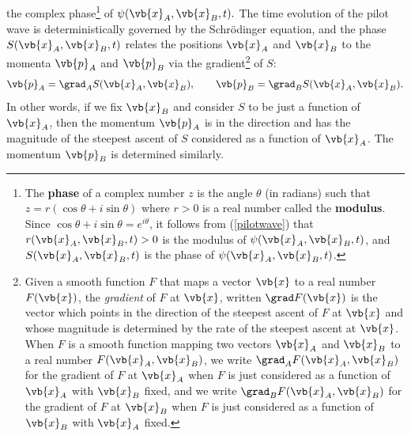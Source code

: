 \documentclass[12pt]{report}
\begin{document}
%
the complex phase\footnote{The \textbf{phase} of a complex number $z$ is the angle $\theta$ (in radians) such that $z=r(\cos \theta + i \sin \theta)$ where $r>0$ is a real number called the \textbf{modulus}. Since $\cos \theta + i\sin \theta=e^{i \theta}$, %
%
it follows from (\ref{pilotwave}) that $r(\vb{x}_A, \vb{x}_B, t)>0$ is the modulus of $\psi(\vb{x}_A, \vb{x}_B, t)$, and $S(\vb{x}_A, \vb{x}_B,t )$ is the phase of $\psi(\vb{x}_A, \vb{x}_B, t)$.} of $\psi(\vb{x}_A, \vb{x}_B, t).$
The time evolution of the pilot wave is deterministically governed by the Schr\"{o}dinger equation, and the phase $S(\vb{x}_A, \vb{x}_B, t )$ relates the positions $\vb{x}_A$ and $\vb{x}_B$ to the momenta $\vb{p}_A$ and $\vb{p}_B$ via the gradient\footnote{Given a smooth function $F$ that maps a vector $\vb{x}$ to a real number $F(\vb{x})$, the \emph{gradient} of $F$ at $\vb{x}$, written $\grad F(\vb{x})$ is the vector which points in the direction of the steepest ascent of $F$ at $\vb{x}$ and whose magnitude is determined by the rate of the steepest ascent at $\vb{x}$. When $F$ is a smooth function mapping two vectors $\vb{x}_A$ and $\vb{x}_B$ to a real number $F(\vb{x}_A, \vb{x}_B)$, we write $\grad_A F(\vb{x}_A, \vb{x}_B)$ for the gradient of $F$ at $\vb{x}_A$ when $F$ is just considered as a function of $\vb{x}_A$ with $\vb{x}_B$ fixed, and we write $\grad_B F(\vb{x}_A, \vb{x}_B)$ for the gradient of $F$ at $\vb{x}_B$ when $F$ is just considered as a function of $\vb{x}_B$ with $\vb{x}_A$ fixed.} of $S$:
\begin{equation}
\vb{p}_A=\grad_A{S}(\vb{x}_A, \vb{x}_B),\qquad
\vb{p}_B=\grad_B{S}(\vb{x}_A, \vb{x}_B).
\end{equation}
In other words, %
%
if we fix $\vb{x}_B$ %
%
and consider $S$ to be just a function of $\vb{x}_A$, then the momentum $\vb{p}_A$ is in the direction and has the magnitude of the steepest ascent of $S$ considered as a function of $\vb{x}_A$. The momentum $\vb{p}_B$ is determined similarly. 
\end{document}
